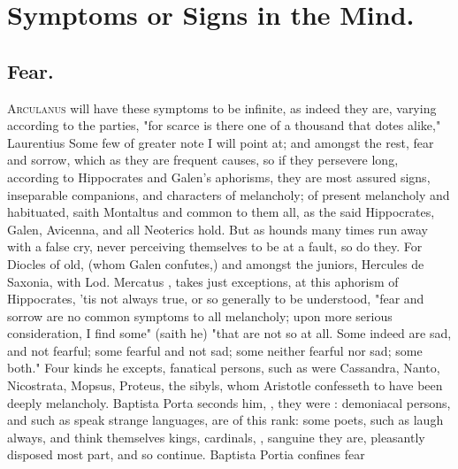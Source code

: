 {%
\section{Symptoms or Signs in the Mind.}

\subsection{Fear.}
\lettrine{A}{rculanus}  will have
these symptoms to be infinite, as indeed they are, varying according to the
parties, "for scarce is there one of a thousand that dotes alike,"
Laurentius  Some few of
greater note I will point at; and amongst the rest, fear and sorrow, which as
they are frequent causes, so if they persevere long, according to Hippocrates
and Galen's aphorisms, they are most assured signs,
inseparable companions, and characters of melancholy; of present melancholy and
habituated, saith Montaltus  and common to them
all, as the said Hippocrates, Galen, Avicenna, and all Neoterics hold. But as
hounds many times run away with a false cry, never perceiving themselves to be
at a fault, so do they. For Diocles of old, (whom Galen confutes,) and amongst
the juniors, Hercules de Saxonia, with Lod. Mercatus
, takes just exceptions, at this
aphorism of Hippocrates, 'tis not always true, or so generally to be
understood, "fear and sorrow are no common symptoms to all melancholy; upon
more serious consideration, I find some" (saith he) "that are not so at all.
Some indeed are sad, and not fearful; some fearful and not sad; some neither
fearful nor sad; some both." Four kinds he excepts, fanatical persons, such as
were Cassandra, Nanto, Nicostrata, Mopsus, Proteus, the sibyls, whom
Aristotle confesseth to have been deeply melancholy.
Baptista Porta seconds him, ,
they were : demoniacal persons, and such as speak strange
languages, are of this rank: some poets, such as laugh always, and think
themselves kings, cardinals, \etc{}, sanguine they are, pleasantly disposed
most part, and so continue. Baptista Portia confines fear
}
